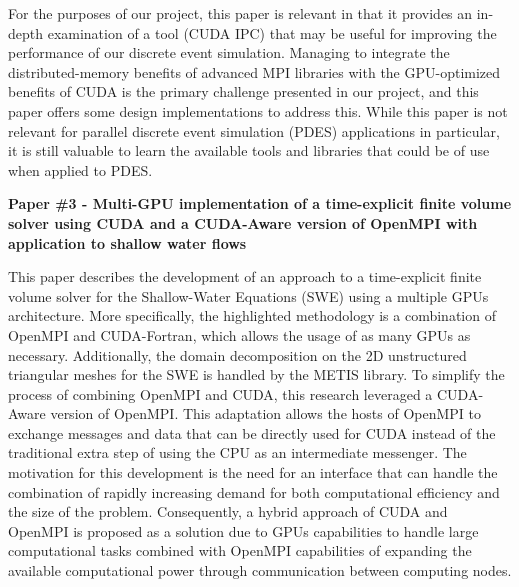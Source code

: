 \documentclass[11pt]{article}
\begin{document}
For the purposes of our project, this paper is relevant in that it provides an in-depth examination of a tool (CUDA IPC) that may be useful for improving the performance of our discrete event simulation. Managing to integrate the distributed-memory benefits of advanced MPI libraries with the GPU-optimized benefits of CUDA is the primary challenge presented in our project, and this paper offers some design implementations to address this. While this paper is not relevant for parallel discrete event simulation (PDES) applications in particular, it is still valuable to learn the available tools and libraries that could be of use when applied to PDES. 

\vspace{1em}

\noindent \textbf{Paper \#3 - Multi-GPU implementation of a time-explicit finite volume solver using CUDA and a CUDA-Aware version of OpenMPI with application to shallow water flows}

This paper describes the development of an approach to a time-explicit finite volume solver for the Shallow-Water Equations (SWE) using a multiple GPUs architecture. More specifically, the highlighted methodology is a combination of OpenMPI and CUDA-Fortran, which allows the usage of as many GPUs as necessary. Additionally, the domain decomposition on the 2D unstructured triangular meshes for the SWE is handled by the METIS library. To simplify the process of combining OpenMPI and CUDA, this research leveraged a CUDA-Aware version of OpenMPI. This adaptation allows the hosts of OpenMPI to exchange messages and data that can be directly used for CUDA instead of the traditional extra step of using the CPU as an intermediate messenger. The motivation for this development is the need for an interface that can handle the combination of rapidly increasing demand for both computational efficiency and the size of the problem. Consequently, a hybrid approach of CUDA and OpenMPI is proposed as a solution due to GPUs capabilities to handle large computational tasks combined with OpenMPI capabilities of expanding the available computational power through communication between computing nodes.
\end{document}
